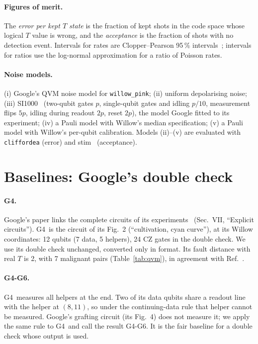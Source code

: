 \documentclass[aps,pra,reprint,superscriptaddress,longbibliography]{revtex4-2}
\newcommand{\Gfour}{\textsf{G4}}
\newcommand{\Gsix}{\textsf{G4-G6}}
\begin{document}
\paragraph{Figures of merit.}
The \emph{error per kept $T$ state} is the fraction of kept shots in the code space whose logical $T$ value is wrong, and the \emph{acceptance} is the fraction of shots with no detection event.
Intervals for rates are Clopper--Pearson 95\,\% intervals~\cite{ClopperPearson1934}; intervals for ratios use the log-normal approximation for a ratio of Poisson rates.

\paragraph{Noise models.}
(i) Google's QVM noise model for \texttt{willow\_pink}; (ii) uniform depolarising noise; (iii) SI1000~\cite{GidneySI1000} (two-qubit gates $p$, single-qubit gates and idling $p/10$, measurement flips $5p$, idling during readout $2p$, reset $2p$), the model Google fitted to its experiment; (iv) a Pauli model with Willow's median specification; (v) a Pauli model with Willow's per-qubit calibration.
Models (ii)--(v) are evaluated with \texttt{cliffordea} (error) and stim~\cite{Gidney2021stim} (acceptance).

\section{Baselines: Google's double check}
\label{sec:baselines}

\paragraph{\Gfour.}
Google's paper links the complete circuits of its experiments~\cite{Rosenfeld2025} (Sec.~VII, ``Explicit circuits''). \Gfour\ is the circuit of its Fig.~2 (``cultivation, cyan curve''), at its Willow coordinates: 12 qubits (7 data, 5 helpers), 24 CZ gates in the double check.
We use its double check unchanged, converted only in format.
Its fault distance with real $T$ is 2, with 7 malignant pairs (Table~\ref{tab:qvm}), in agreement with Ref.~\cite{Chan2026diagnosing}.

\paragraph{\Gsix.}
\Gfour\ measures all helpers at the end. Two of its data qubits share a readout line with the helper at $(8,11)$, so under the continuing-data rule that helper cannot be measured. Google's grafting circuit (its Fig.~4) does not measure it; we apply the same rule to \Gfour\ and call the result \Gsix.
It is the fair baseline for a double check whose output is used.
\end{document}
